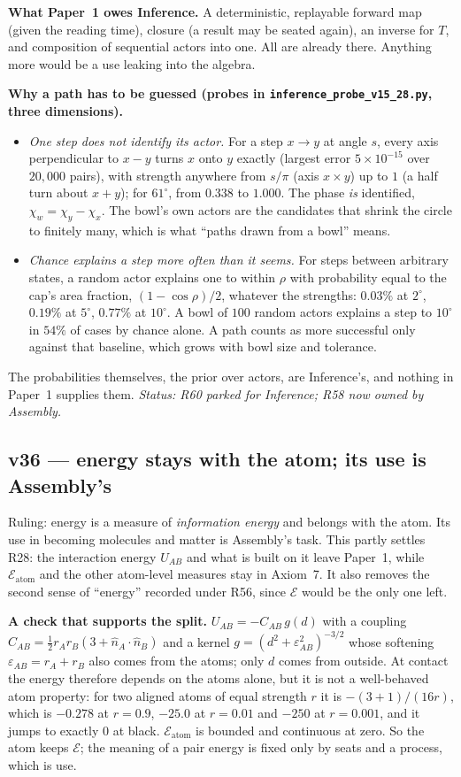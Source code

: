 \documentclass[11pt]{article}
\begin{document}
\textbf{What Paper~1 owes Inference.} A deterministic, replayable forward map
(given the reading time), closure (a result may be seated again), an inverse
for $T$, and composition of sequential actors into one. All are already there.
Anything more would be a use leaking into the algebra.

\textbf{Why a path has to be guessed (probes in
\texttt{inference\_probe\_v15\_28.py}, three dimensions).}
\begin{itemize}
\item \emph{One step does not identify its actor.} For a step $x\to y$ at
angle $s$, every axis perpendicular to $x-y$ turns $x$ onto $y$ exactly
(largest error $5\times10^{-15}$ over $20{,}000$ pairs), with strength
anywhere from $s/\pi$ (axis $x\times y$) up to $1$ (a half turn about
$x+y$); for $61^\circ$, from $0.338$ to $1.000$. The phase \emph{is}
identified, $\chi_w=\chi_y-\chi_x$. The bowl's own actors are the candidates
that shrink the circle to finitely many, which is what ``paths drawn from a
bowl'' means.
\item \emph{Chance explains a step more often than it seems.} For steps
between arbitrary states, a random actor explains one to within $\rho$ with
probability equal to the cap's area fraction, $(1-\cos\rho)/2$, whatever the
strengths: $0.03\%$ at $2^\circ$, $0.19\%$ at $5^\circ$, $0.77\%$ at $10^\circ$.
A bowl of $100$ random actors explains a step to $10^\circ$ in $54\%$ of cases by
chance alone. A path counts as more successful only against that baseline,
which grows with bowl size and tolerance.
\end{itemize}
The probabilities themselves, the prior over actors, are Inference's, and
nothing in Paper~1 supplies them. \emph{Status: R60 parked for Inference; R58
now owned by Assembly.}


\subsection*{v36 --- energy stays with the atom; its use is Assembly's}
Ruling: energy is a measure of \emph{information energy} and belongs with the
atom. Its use in becoming molecules and matter is Assembly's task. This partly
settles R28: the interaction energy $U_{AB}$ and what is built on it leave
Paper~1, while $\mathcal{E}_{\text{atom}}$ and the other atom-level measures stay
in Axiom~7. It also removes the second sense of ``energy'' recorded under R56,
since $\mathcal{E}$ would be the only one left.

\textbf{A check that supports the split.} $U_{AB}=-C_{AB}\,g(d)$ with a coupling
$C_{AB}=\tfrac12 r_Ar_B(3+\hat n_A\!\cdot\!\hat n_B)$ and a kernel
$g=(d^2+\varepsilon_{AB}^2)^{-3/2}$ whose softening $\varepsilon_{AB}=r_A+r_B$
also comes from the atoms; only $d$ comes from outside. At contact the energy
therefore depends on the atoms alone, but it is not a well-behaved atom
property: for two aligned atoms of equal strength $r$ it is $-(3+1)/(16r)$,
which is $-0.278$ at $r=0.9$, $-25.0$ at $r=0.01$ and $-250$ at $r=0.001$,
and it jumps to exactly $0$ at black. $\mathcal{E}_{\text{atom}}$ is bounded and
continuous at zero. So the atom keeps $\mathcal{E}$; the meaning of a pair
energy is fixed only by seats and a process, which is use.
\end{document}
